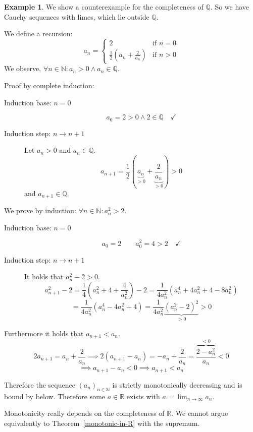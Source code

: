 \documentclass[a4paper,landscape,twocolumn]{article}
\theoremstyle{definition}
\newtheorem{ex}{Example}
\newcommand\seq[1]{{\left(#1\right)}_{n \in \mathbb N}}
\begin{document}
\begin{ex}
  We show a counterexample for the completeness of $\mathbb Q$.
  So we have Cauchy sequences with limes, which lie outside $\mathbb Q$.

  We define a recursion:
  \[
    a_n = \begin{cases}
      2 & \text{if } n = 0 \\
      \frac12 \left(a_n + \frac2{a_n}\right) & \text{if } n > 0
    \end{cases}
  \]
  We observe, $\forall n \in \mathbb N: a_n > 0 \land a_n \in \mathbb Q$.

  Proof by complete induction:
  \begin{description}
    \item[Induction base: $n = 0$]
      \[ a_0 = 2 > 0 \land 2 \in \mathbb Q \quad \checkmark \]
    \item[Induction step: $n \to n + 1$]
      Let $a_n > 0$ and $a_n \in \mathbb Q$.
      \[ a_{n+1} = \frac12 \left(\underbrace{a_n}_{>0} + \underbrace{\frac2{a_n}}_{>0}\right) > 0 \]
      and $a_{n+1} \in \mathbb Q$.
  \end{description}

  We prove by induction: $\forall n \in \mathbb N: a_n^2 > 2$.
  \begin{description}
    \item[Induction base: $n = 0$]
      \[ a_0 = 2 \qquad a_0^2 = 4 > 2 \quad \checkmark \]
    \item[Induction step: $n \to n+1$]
      It holds that $a_n^2 - 2 > 0$.
      \[
          a_{n+1}^2 - 2
          = \frac14 \left(a_n^2 + 4 + \frac4{a_n^2}\right) - 2
          = \frac{1}{4a_n^2} \left(a_n^4 + 4a_n^2 + 4 - 8a_n^2\right)
      \] \[
          = \frac{1}{4a_n^2} \left(a_n^4 - 4a_n^2 + 4\right)
          = \frac{1}{4a_n^2} \underbrace{\left(a_n^2 - 2\right)^2}_{>0} > 0
      \]
  \end{description}

  Furthermore it holds that $a_{n+1} < a_n$.
  \[ 2a_{n+1} = a_n + \frac2{a_n} \implies 2 (a_{n+1} - a_n) = -a_n + \frac2{a_n} = \frac{\overbrace{2 - a_n^2}^{<0}}{a_n} < 0 \]
  \[ \implies a_{n+1} - a_n < 0 \implies a_{n+1} < a_n \]

  Therefore the sequence $\seq{a_n}$ is strictly monotonically decreasing and is bound by below.
  Therefore some $a \in \mathbb R$ exists with $a = \lim_{n\to\infty} a_n$.

  Monotonicity really depends on the completeness of $\mathbb R$.
  We cannot argue equivalently to Theorem~\ref{monotonic-in-R} with the supremum.


\end{ex}
\end{document}
